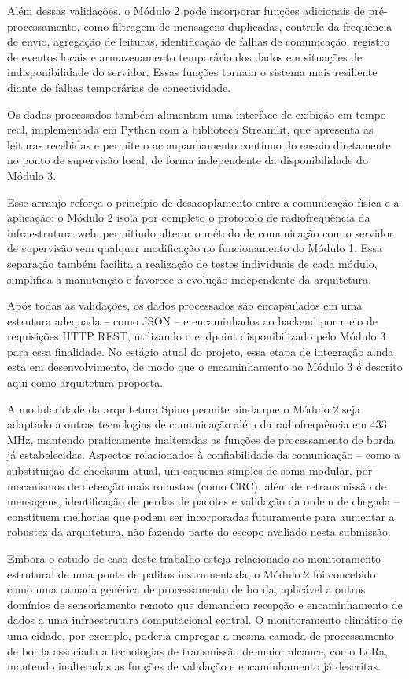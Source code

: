 \documentclass[conference]{IEEEtran}
\begin{document}
Além dessas validações, o Módulo 2 pode incorporar funções adicionais de pré-processamento, como filtragem de mensagens duplicadas, controle da frequência de envio, agregação de leituras, identificação de falhas de comunicação, registro de eventos locais e armazenamento temporário dos dados em situações de indisponibilidade do servidor. Essas funções tornam o sistema mais resiliente diante de falhas temporárias de conectividade.

Os dados processados também alimentam uma interface de exibição em tempo real, implementada em Python com a biblioteca Streamlit, que apresenta as leituras recebidas e permite o acompanhamento contínuo do ensaio diretamente no ponto de supervisão local, de forma independente da disponibilidade do Módulo 3.

Esse arranjo reforça o princípio de desacoplamento entre a comunicação física e a aplicação: o Módulo 2 isola por completo o protocolo de radiofrequência da infraestrutura web, permitindo alterar o método de comunicação com o servidor de supervisão sem qualquer modificação no funcionamento do Módulo 1. Essa separação também facilita a realização de testes individuais de cada módulo, simplifica a manutenção e favorece a evolução independente da arquitetura.

Após todas as validações, os dados processados são encapsulados em uma estrutura adequada -- como JSON -- e encaminhados ao backend por meio de requisições HTTP REST, utilizando o endpoint disponibilizado pelo Módulo 3 para essa finalidade. No estágio atual do projeto, essa etapa de integração ainda está em desenvolvimento, de modo que o encaminhamento ao Módulo 3 é descrito aqui como arquitetura proposta.

A modularidade da arquitetura Spino permite ainda que o Módulo 2 seja adaptado a outras tecnologias de comunicação além da radiofrequência em 433 MHz, mantendo praticamente inalteradas as funções de processamento de borda já estabelecidas. Aspectos relacionados à confiabilidade da comunicação -- como a substituição do checksum atual, um esquema simples de soma modular, por mecanismos de detecção mais robustos (como CRC), além de retransmissão de mensagens, identificação de perdas de pacotes e validação da ordem de chegada -- constituem melhorias que podem ser incorporadas futuramente para aumentar a robustez da arquitetura, não fazendo parte do escopo avaliado nesta submissão.

Embora o estudo de caso deste trabalho esteja relacionado ao monitoramento estrutural de uma ponte de palitos instrumentada, o Módulo 2 foi concebido como uma camada genérica de processamento de borda, aplicável a outros domínios de sensoriamento remoto que demandem recepção e encaminhamento de dados a uma infraestrutura computacional central. O monitoramento climático de uma cidade, por exemplo, poderia empregar a mesma camada de processamento de borda associada a tecnologias de transmissão de maior alcance, como LoRa, mantendo inalteradas as funções de validação e encaminhamento já descritas.
\end{document}
